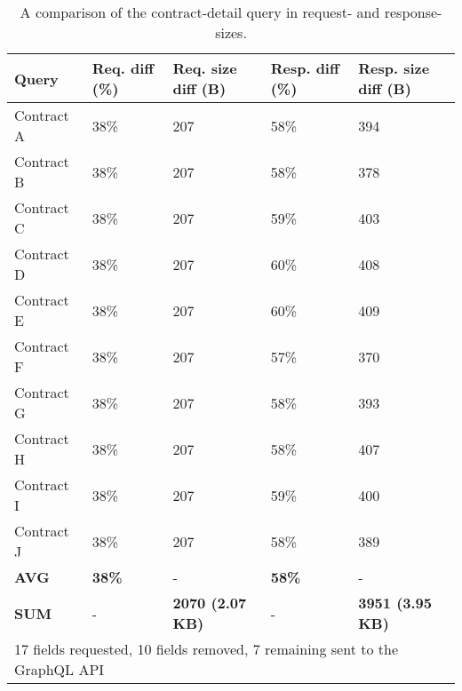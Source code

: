 \ifshowTables
\begin{table}[!htbp]
  \begin{tabular}{|l|l|l|l|l|}
  \hline
  \textbf{Query} & \textbf{Req. diff (\%)}  & \textbf{Req. size diff (B)} & \textbf{Resp. diff (\%)} & \textbf{Resp. size diff (B)}  \\
  \hline
  Contract A & 38\% & 207 & 58\% & 394 \\
  \hline
  Contract B & 38\% & 207 & 58\% & 378 \\
  \hline
  Contract C & 38\% & 207 & 59\% & 403 \\
  \hline
  Contract D & 38\% & 207 & 60\% & 408 \\
  \hline
  Contract E & 38\% & 207 & 60\% & 409 \\
  \hline
  Contract F & 38\% & 207 & 57\% & 370 \\
  \hline
  Contract G & 38\% & 207 & 58\% & 393 \\
  \hline
  Contract H & 38\% & 207 & 58\% & 407 \\
  \hline
  Contract I  & 38\% & 207 & 59\% & 400 \\
  \hline
  Contract J & 38\% & 207 & 58\% & 389 \\
  \hline
  \hline
  \textbf{AVG} & \textbf{38\%} & - & \textbf{58\%} & - \\
  \hline
  \hline
  \textbf{SUM} & - & \textbf{2070 (2.07 KB)} & - & \textbf{3951 (3.95 KB)} \\
  \hline
  \multicolumn{5}{l}{17 fields requested, 10 fields removed, 7 remaining sent to the GraphQL \ac{API}}
  \end{tabular}
  \caption{A comparison of the contract-detail query in request- and response-sizes.}\label{table:code:comparison-contract-reduction}
\end{table}
\fi